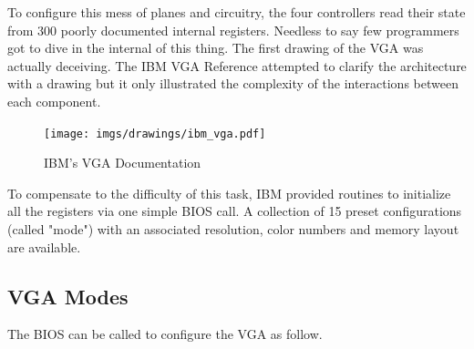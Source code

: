 \documentclass[book.tex]{subfiles}
\begin{document}
 

\par
To configure this mess of planes and circuitry, the four controllers read their state from 300 poorly documented internal registers. Needless to say few programmers got to dive in the internal of this thing. The first drawing of the VGA was actually deceiving. The IBM VGA Reference attempted to clarify the architecture with a drawing but it only illustrated the complexity of the interactions between each component.\\
 \begin{figure}[H]
\centering
\texttt{[image: imgs/drawings/ibm\_vga.pdf]}
\caption{IBM's VGA Documentation}
\label{fig:ibm_vga}
\end{figure}

\bigskip



To compensate to the difficulty of this task, IBM provided routines to initialize all the registers via one simple BIOS call. A collection of 15 preset configurations (called "mode") with an associated resolution, color numbers and memory layout are available.

\subsection{VGA Modes}

The BIOS can be called to configure the VGA as follow.
\end{document}
